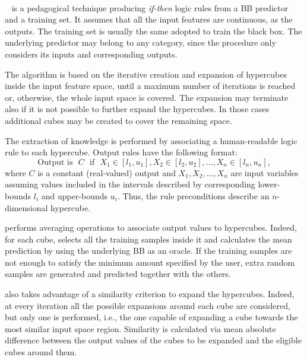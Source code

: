 \documentclass[
]{ceurart}
\begin{document}
\paragraph{\iter}\label{par:iter}

\iter{}~\cite{huysmans2006iter} is a pedagogical technique producing \emph{if-then} logic rules from a BB predictor and a training set.
%
It assumes that all the input features are continuous, as the outputs.
%
The training set is usually the same adopted to train the black box.
%
The underlying predictor may belong to any category, since the procedure only considers its inputs and corresponding outputs.

The algorithm is based on the iterative creation and expansion of hypercubes inside the input feature space, until a maximum number of iterations is reached or, otherwise, the whole input space is covered.
%
The expansion may terminate also if it is not possible to further expand the hypercubes.
%
In those cases additional cubes may be created to cover the remaining space.

The extraction of knowledge is performed by associating a human-readable logic rule to each hypercube.
%
Output rules have the following format:
%
\begin{equation*}
	\text{Output is ~} C \text{~ if ~} X_1 \in [l_1, u_1], X_2 \in [l_2, u_2], ..., X_n \in [l_n, u_n],
\end{equation*}
%
where $C$ is a constant (real-valued) output and $X_1, X_2, ..., X_n$ are input variables assuming values included in the intervals described by corresponding lower-bounds $l_i$ and upper-bounds $u_i$.
%
Thus, the rule preconditions describe an $n$-dimensional hypercube.

\iter{} performs averaging operations to associate output values to hypercubes.
%
Indeed, for each cube, \iter{} selects all the training samples inside it and calculates the mean prediction by using the underlying BB as an oracle.
%
If the training samples are not enough to satisfy the minimum amount specified by the user, extra random samples are generated and predicted together with the others.

\iter{} also takes advantage of a similarity criterion to expand the hypercubes.
%
Indeed, at every iteration all the possible expansions around each cube are considered, but only one is performed, i.e., the one capable of expanding a cube towards the most similar input space region.
%
Similarity is calculated via mean absolute difference between the output values of the cubes to be expanded and the eligible cubes around them.
\end{document}
